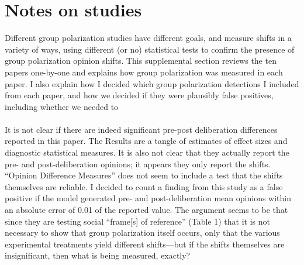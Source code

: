 \documentclass[letterpaper,man,natbib]{apa6}
\begin{document}


\setlength{\bibleftmargin}{.125in}
\setlength{\bibindent}{-\bibleftmargin}



\appendix

\section{Notes on studies}

Different group polarization studies have different goals, and measure shifts
in a variety of ways, using different (or no) statistical tests to confirm
the presence of group polarization opinion shifts. This supplemental section
reviews the ten papers one-by-one and explains how group 
polarization was measured in each paper. I also explain how I decided which
group polarization detections I included from each paper, and how we decided
if they were plausibly false positives, including whether we needed to 

\paragraph{\citet{Abrams1990}} 

\paragraph{\citet{Burnstein1973}}

\paragraph{\citet{Hogg1990}} It is not clear if there are indeed significant
pre-post deliberation differences reported in this paper. The Results are a
tangle of estimates of effect sizes and diagnostic statistical measures. It
is also not clear that they actually report the pre- and post-deliberation
opinions; it appears they only report the shifts. ``Opinion Difference
Measures'' does not seem to include a test that the shifts themselves are
reliable. I decided to count a finding from this study as a false positive if
the model generated pre- and post-deliberation mean opinions within an
absolute error of 0.01 of the reported value. The argument seems to be that
since they are testing social ``frame[s] of reference'' (Table 1) that it is
not necessary to show that group polarization itself occurs, only that the
various experimental treatments yield different shifts---but if the shifts
themselves are insignificant, then what is being measured, exactly?
\end{document}
